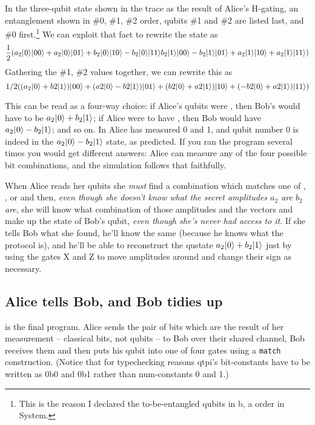 \documentclass[11pt,a4paper]{book}
\newcommand{\verbtt}[1]{\texttt{\small{}#1}}
\begin{document}
In the three-qubit state shown in the trace as the result of Alice's H-gating, an entanglement shown in \#0, \#1, \#2 order, qubits \#1 and \#2 are listed last, and \#0 first.\footnote{This is the reason I declared the to-be-entangled qubits in b, a order in System.} We can exploit that fact to rewrite the state as
\begin{equation*}
\frac{1}{2}(a_{2}|\hspace{0.5pt}0\rangle|\hspace{0.5pt}00\rangle+a_{2}|\hspace{0.5pt}0\rangle|\hspace{0.5pt}01\rangle+b_{2}|\hspace{0.5pt}0\rangle|10\rangle-b_{2}|\hspace{0.5pt}0\rangle|11\rangle
			b_{2}|1\rangle\relax|\hspace{0.5pt}00\rangle-b_{2}|1\rangle\relax|\hspace{0.5pt}01\rangle+a_{2}|1\rangle\relax|10\rangle+a_{2}|1\rangle\relax|11\rangle)
\end{equation*}
Gathering the \#1, \#2 values together, we can rewrite this as 
\begin{equation*}
1/2((a_{2}|\hspace{0.5pt}0\rangle+b2|1\rangle\relax)|\hspace{0.5pt}00\rangle+(a2|\hspace{0.5pt}0\rangle-b2|1\rangle\relax)|\hspace{0.5pt}01\rangle+(b2|\hspace{0.5pt}0\rangle+a2|1\rangle\relax)|10\rangle+(-b2|\hspace{0.5pt}0\rangle+a2|1\rangle\relax)|11\rangle)
\end{equation*}

This can be read as a four-way choice: if Alice's qubits were \zerozero, then Bob's would have to be $a_{2}|\hspace{0.5pt}0\rangle+b_{2}|1\rangle\relax$; if Alice were to have \zeroone, then Bob would have $a_{2}|\hspace{0.5pt}0\rangle-b_{2}|1\rangle\relax$; and so on. In  Alice has measured 0 and 1, and qubit number 0 is indeed in the $a_{2}|\hspace{0.5pt}0\rangle-b_{2}|1\rangle\relax$ state, as predicted. If you ran the program several times you would get different answers: Alice can measure any of the four possible bit combinations, and the simulation follows that faithfully.

When Alice reads her qubits she \emph{must} find a combination which matches one of \zerozero, \zeroone, \onezero{} or \oneone{} and then, \emph{even though she doesn't know what the secret amplitudes $a_{2}$ are $b_{2}$ are}, she will know what combination of those amplitudes and the vectors \zero{} and \one{} make up the state of Bob's qubit, \emph{even though she's never had access to it}. If she tells Bob what she found, he'll know the same (because he knows what the protocol is), and he'll be able to reconstruct the qustate $a_{2}|\hspace{0.5pt}0\rangle+b_{2}|1\rangle\relax$ just by using the gates X and Z to move amplitudes around and change their sign as necessary. 

\subsection{Alice tells Bob, and Bob tidies up}

 is the final program. Alice sends the pair of bits which are the result of her measurement -- classical bits, not qubits -- to Bob over their shared channel, Bob receives them and then puts his qubit into one of four gates using a \verbtt{match} construction. (Notice that for typechecking reasons qtpi's bit-constants have to be written as 0b0 and 0b1 rather than num-constants 0 and 1.) 
\end{document}
